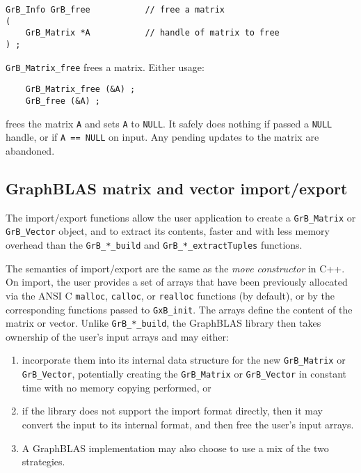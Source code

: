 \documentclass[12pt]{article}
\begin{document}
\begin{mdframed}[userdefinedwidth=6in]
{\footnotesize
\begin{verbatim}
GrB_Info GrB_free           // free a matrix
(
    GrB_Matrix *A           // handle of matrix to free
) ;
\end{verbatim} } \end{mdframed}

\verb'GrB_Matrix_free' frees a matrix.  Either usage:

    {\small
    \begin{verbatim}
    GrB_Matrix_free (&A) ;
    GrB_free (&A) ; \end{verbatim}}

\noindent
frees the matrix \verb'A' and sets \verb'A' to \verb'NULL'.  It safely does
nothing if passed a \verb'NULL' handle, or if \verb'A == NULL' on input.  Any
pending updates to the matrix are abandoned.

\newpage
\subsection{GraphBLAS matrix and vector import/export} %
\label{import_export}

The import/export functions allow the user application to create a
\verb'GrB_Matrix' or \verb'GrB_Vector' object, and to extract its contents,
faster and with less memory overhead than the \verb'GrB_*_build' and
\verb'GrB_*_extractTuples' functions.

The semantics of import/export are the same as the {\em move constructor} in
C++.  On import, the user provides a set of arrays that have been previously
allocated via the ANSI C \verb'malloc', \verb'calloc', or \verb'realloc'
functions (by default), or by the corresponding functions passed to
\verb'GxB_init'.  The arrays define the content of the matrix or vector.
Unlike \verb'GrB_*_build', the GraphBLAS library then takes ownership of the
user's input arrays and may either:

\begin{enumerate}
\item incorporate them
into its internal data structure for the new \verb'GrB_Matrix' or
\verb'GrB_Vector', potentially creating the \verb'GrB_Matrix' or
\verb'GrB_Vector' in constant time with no memory copying performed, or
\item if
the library does not support the import format directly, then it may convert
the input to its internal format, and then free the user's input arrays.
\item A
GraphBLAS implementation may also choose to use a mix of the two strategies.
\end{enumerate}
\end{document}
